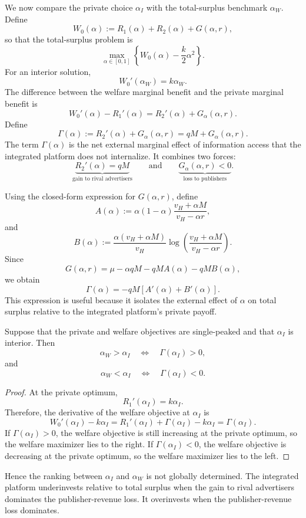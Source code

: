 We now compare the private choice $\alpha_I$ with the total-surplus benchmark $\alpha_W$.
Define
\[
W_0(\alpha):=R_1(\alpha)+R_2(\alpha)+G(\alpha,r),
\]
so that the total-surplus problem is
\[
\max_{\alpha\in[0,1]}
\left\{
W_0(\alpha)-\frac{k}{2}\alpha^2
\right\}.
\]
For an interior solution,
\[
W_0'(\alpha_W)=k\alpha_W.
\]
The difference between the welfare marginal benefit and the private marginal benefit is
\[
W_0'(\alpha)-R_1'(\alpha)
=
R_2'(\alpha)+G_\alpha(\alpha,r).
\]
Define
\[
\Gamma(\alpha):=R_2'(\alpha)+G_\alpha(\alpha,r)
=
qM+G_\alpha(\alpha,r).
\]
The term $\Gamma(\alpha)$ is the net external marginal effect of information access that the
integrated platform does not internalize. It combines two forces:
\[
\underbrace{R_2'(\alpha)=qM}_{\text{gain to rival advertisers}}
\qquad\text{and}\qquad
\underbrace{G_\alpha(\alpha,r)<0}_{\text{loss to publishers}}.
\]

Using the closed-form expression for $G(\alpha,r)$, define
\[
A(\alpha)
:=
\alpha(1-\alpha)
\frac{v_H+\alpha M}{v_H-\alpha r},
\]
and
\[
B(\alpha)
:=
\frac{\alpha(v_H+\alpha M)}{v_H}
\log\left(
\frac{v_H+\alpha M}{v_H-\alpha r}
\right).
\]
Since
\[
G(\alpha,r)=\mu-\alpha qM-qM A(\alpha)-qM B(\alpha),
\]
we obtain
\[
\Gamma(\alpha)
=
-qM\left[A'(\alpha)+B'(\alpha)\right].
\]
This expression is useful because it isolates the external effect of $\alpha$ on total surplus
relative to the integrated platform's private payoff.

\begin{prop}
Suppose that the private and welfare objectives are single-peaked and that $\alpha_I$ is interior.
Then
\[
\alpha_W>\alpha_I
\quad\Longleftrightarrow\quad
\Gamma(\alpha_I)>0,
\]
and
\[
\alpha_W<\alpha_I
\quad\Longleftrightarrow\quad
\Gamma(\alpha_I)<0.
\]
\end{prop}

\begin{proof}
At the private optimum,
\[
R_1'(\alpha_I)=k\alpha_I.
\]
Therefore, the derivative of the welfare objective at $\alpha_I$ is
\[
W_0'(\alpha_I)-k\alpha_I
=
R_1'(\alpha_I)+\Gamma(\alpha_I)-k\alpha_I
=
\Gamma(\alpha_I).
\]
If $\Gamma(\alpha_I)>0$, the welfare objective is still increasing at the private optimum, so
the welfare maximizer lies to the right. If $\Gamma(\alpha_I)<0$, the welfare objective is
decreasing at the private optimum, so the welfare maximizer lies to the left.
\end{proof}

Hence the ranking between $\alpha_I$ and $\alpha_W$ is not globally determined. The
integrated platform underinvests relative to total surplus when the gain to rival advertisers
dominates the publisher-revenue loss. It overinvests when the publisher-revenue loss dominates.

